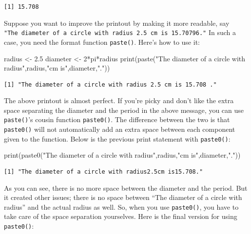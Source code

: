 \documentclass[
  letterpaper,
  DIV=11,
  numbers=noendperiod]{scrreprt}
\newenvironment{Shaded}{\begin{snugshade}}{\end{snugshade}}
\newcommand{\DecValTok}[1]{\textcolor[rgb]{0.68,0.00,0.00}{#1}}
\newcommand{\FloatTok}[1]{\textcolor[rgb]{0.68,0.00,0.00}{#1}}
\newcommand{\FunctionTok}[1]{\textcolor[rgb]{0.28,0.35,0.67}{#1}}
\newcommand{\NormalTok}[1]{\textcolor[rgb]{0.00,0.23,0.31}{#1}}
\newcommand{\OtherTok}[1]{\textcolor[rgb]{0.00,0.23,0.31}{#1}}
\newcommand{\SpecialCharTok}[1]{\textcolor[rgb]{0.37,0.37,0.37}{#1}}
\newcommand{\StringTok}[1]{\textcolor[rgb]{0.13,0.47,0.30}{#1}}
\begin{document}
\begin{verbatim}
[1] 15.708
\end{verbatim}

Suppose you want to improve the printout by making it more readable, say
\texttt{"The\ diameter\ of\ a\ circle\ with\ radius\ 2.5\ cm\ is\ 15.70796."}
In such a case, you need the format function \texttt{paste()}. Here's
how to use it:

\begin{Shaded}
\begin{Highlighting}[]
\NormalTok{radius }\OtherTok{\textless{}{-}} \FloatTok{2.5}
\NormalTok{diameter }\OtherTok{\textless{}{-}} \DecValTok{2}\SpecialCharTok{*}\NormalTok{pi}\SpecialCharTok{*}\NormalTok{radius}
\FunctionTok{print}\NormalTok{(}\FunctionTok{paste}\NormalTok{(}\StringTok{"The diameter of a circle with radius"}\NormalTok{,radius,}\StringTok{"cm is"}\NormalTok{,diameter,}\StringTok{"."}\NormalTok{))}
\end{Highlighting}
\end{Shaded}

\begin{verbatim}
[1] "The diameter of a circle with radius 2.5 cm is 15.708 ."
\end{verbatim}

The above printout is almost perfect. If you're picky and don't like the
extra space separating the diameter and the period in the above message,
you can use \texttt{paste()}'s cousin function \texttt{paste0()}. The
difference between the two is that \texttt{paste0()} will not
automatically add an extra space between each component given to the
function. Below is the previous print statement with \texttt{paste0()}:

\begin{Shaded}
\begin{Highlighting}[]
\FunctionTok{print}\NormalTok{(}\FunctionTok{paste0}\NormalTok{(}\StringTok{"The diameter of a circle with radius"}\NormalTok{,radius,}\StringTok{"cm is"}\NormalTok{,diameter,}\StringTok{"."}\NormalTok{))}
\end{Highlighting}
\end{Shaded}

\begin{verbatim}
[1] "The diameter of a circle with radius2.5cm is15.708."
\end{verbatim}

As you can see, there is no more space between the diameter and the
period. But it created other issues; there is no space between ``The
diameter of a circle with radius'' and the actual radius as well. So,
when you use \texttt{paste0()}, you have to take care of the space
separation yourselves. Here is the final version for using
\texttt{paste0()}:
\end{document}
